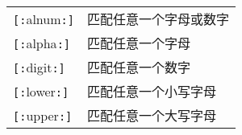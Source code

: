 \begin{center} 
\tablelasttail{\bottomrule}

\begin{supertabular}{p{4.cm}p{10cm}}
\verb"["\verb":"alnum\verb":"\verb"]"	& 匹配任意一个字母或数字 \\
\verb"["\verb":"alpha\verb":"\verb"]" & 匹配任意一个字母 \\
\verb"["\verb":"digit\verb":"\verb"]"	& 匹配任意一个数字 \\
\verb"["\verb":"lower\verb":"\verb"]"	& 匹配任意一个小写字母 \\
\verb"["\verb":"upper\verb":"\verb"]"	& 匹配任意一个大写字母 \\

\end{supertabular}
\end{center}

